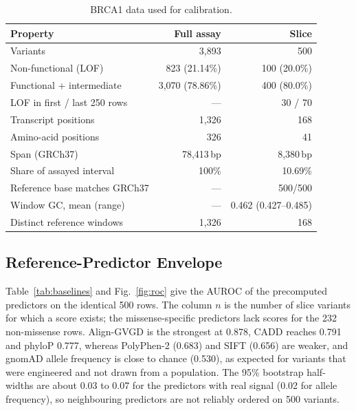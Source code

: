 \documentclass[10pt,journal,a4paper]{IEEEtran}
\begin{document}
\begin{table}[!t]
\caption{BRCA1 data used for calibration.}
\label{tab:slice}
\centering
\footnotesize
\begin{tabular}{@{}lrr@{}}
\toprule
Property & Full assay & Slice \\
\midrule
Variants & 3{,}893 & 500 \\
Non-functional (LOF) & 823 (21.14\%) & 100 (20.0\%) \\
Functional + intermediate & 3{,}070 (78.86\%) & 400 (80.0\%) \\
LOF in first / last 250 rows & --- & 30 / 70 \\
Transcript positions & 1{,}326 & 168 \\
Amino-acid positions & 326 & 41 \\
Span (GRCh37) & 78{,}413\,bp & 8{,}380\,bp \\
Share of assayed interval & 100\% & 10.69\% \\
Reference base matches GRCh37 & --- & 500/500 \\
Window GC, mean (range) & --- & 0.462 (0.427--0.485) \\
Distinct reference windows & 1{,}326 & 168 \\
\bottomrule
\end{tabular}
\end{table}

\subsection{Reference-Predictor Envelope}
\label{sec:res-baselines}
Table~\ref{tab:baselines} and Fig.~\ref{fig:roc} give the AUROC of the precomputed predictors on the identical 500 rows. The column $n$ is the number of slice variants for which a score exists; the missense-specific predictors lack scores for the 232 non-missense rows. Align-GVGD is the strongest at 0.878, CADD reaches 0.791 and phyloP 0.777, whereas PolyPhen-2 (0.683) and SIFT (0.656) are weaker, and gnomAD allele frequency is close to chance (0.530), as expected for variants that were engineered and not drawn from a population. The 95\% bootstrap half-widths are about 0.03 to 0.07 for the predictors with real signal (0.02 for allele frequency), so neighbouring predictors are not reliably ordered on 500 variants.
\end{document}
